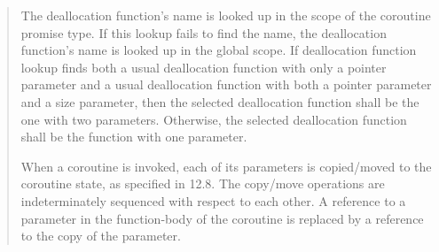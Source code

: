 \begin{quote}
\pnum
The deallocation function's name is looked up in the scope of the coroutine promise type. If this lookup fails to find the name, the deallocation function's name is looked up in the global scope. If deallocation function lookup finds both a usual deallocation function with only a pointer parameter and a usual deallocation function with both a pointer parameter and a size parameter, then the selected deallocation function shall be the one with two parameters. Otherwise, the selected deallocation function shall be the function with one parameter. 


\pnum
When a coroutine is invoked, each of its parameters is copied/moved to the coroutine state, as specified in 12.8.  The copy/move operations are indeterminately sequenced with respect to each other.
A reference to a parameter in the function-body of the coroutine is replaced by a reference to the copy of the parameter.

%
%






\end{quote}
